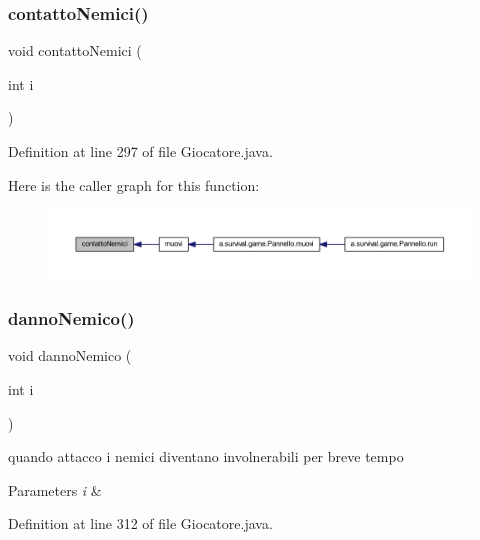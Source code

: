 \subsubsection{\texorpdfstring{contatto\+Nemici()}{contattoNemici()}}
{\footnotesize\ttfamily void contatto\+Nemici (\begin{DoxyParamCaption}\item[{int}]{i }\end{DoxyParamCaption})}



Definition at line 297 of file Giocatore.\+java.

Here is the caller graph for this function\+:
\nopagebreak
\begin{figure}[H]
\begin{center}
\leavevmode
\includegraphics[width=350pt]{class_entita_1_1_giocatore_a867fc5532a9f20042ecde7951b83c499_icgraph}
\end{center}
\end{figure}
\mbox{\label{class_entita_1_1_giocatore_a0814609fcd5c78e217a57e65bb65f7b4}} 
\subsubsection{\texorpdfstring{danno\+Nemico()}{dannoNemico()}}
{\footnotesize\ttfamily void danno\+Nemico (\begin{DoxyParamCaption}\item[{int}]{i }\end{DoxyParamCaption})}



quando attacco i nemici diventano involnerabili per breve tempo 


\begin{DoxyParams}{Parameters}
{\em i} & \\
\hline
\end{DoxyParams}


Definition at line 312 of file Giocatore.\+java.

